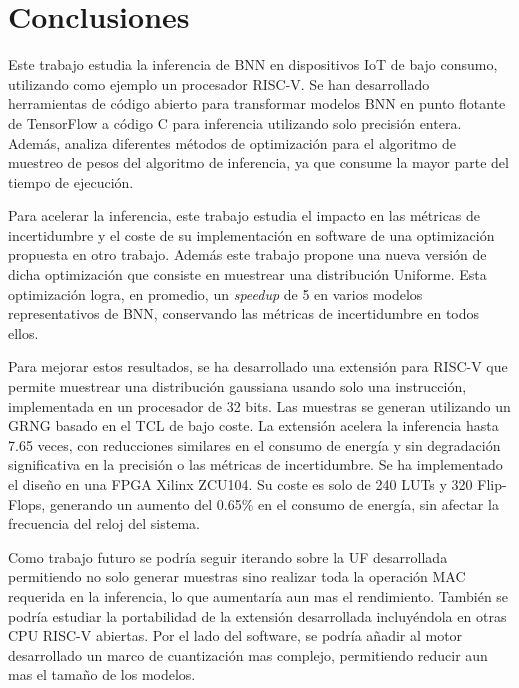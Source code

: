 \chapter{Conclusiones} \label{ch:conclusion}

Este trabajo estudia la inferencia de BNN en dispositivos IoT de bajo consumo, utilizando como ejemplo un procesador RISC-V. Se han desarrollado herramientas de código abierto para transformar modelos BNN en punto flotante de TensorFlow a código C para inferencia utilizando solo precisión entera. Además, analiza diferentes métodos de optimización para el algoritmo de muestreo de pesos del algoritmo de inferencia, ya que consume la mayor parte del tiempo de ejecución.

Para acelerar la inferencia, este trabajo estudia el impacto en las métricas de incertidumbre y el coste de su implementación en software de una optimización propuesta en otro trabajo. Además este trabajo propone una nueva versión de dicha optimización que consiste en muestrear una distribución Uniforme. Esta optimización logra, en promedio, un \textit{speedup} de 5 en varios modelos representativos de BNN, conservando las métricas de incertidumbre en todos ellos.

Para mejorar estos resultados, se ha desarrollado una extensión para RISC-V que permite muestrear una distribución gaussiana usando solo una instrucción, implementada en un procesador de 32 bits. Las muestras se generan utilizando un GRNG basado en el TCL de bajo coste. La extensión acelera la inferencia hasta 7.65 veces, con reducciones similares en el consumo de energía y sin degradación significativa en la precisión o las métricas de incertidumbre. Se ha implementado el diseño en una FPGA Xilinx ZCU104. Su coste es solo de 240 LUTs y 320 Flip-Flops, generando un aumento del 0.65\% en el consumo de energía, sin afectar la frecuencia del reloj del sistema.

Como trabajo futuro se podría seguir iterando sobre la UF desarrollada permitiendo no solo generar muestras sino realizar toda la operación MAC requerida en la inferencia, lo que aumentaría aun mas el rendimiento. También se podría estudiar la portabilidad de la extensión desarrollada incluyéndola en otras CPU RISC-V abiertas. Por el lado del software, se podría añadir al motor desarrollado un marco de cuantización mas complejo, permitiendo reducir aun mas el tamaño de los modelos.
